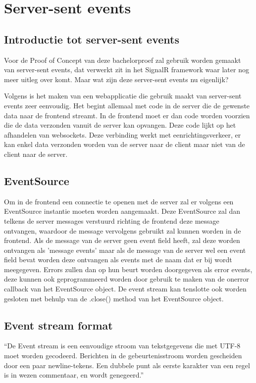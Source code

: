 \section{Server-sent events}
\subsection{Introductie tot server-sent events}
Voor de Proof of Concept van deze bachelorproef zal gebruik worden gemaakt van server-sent events, dat verwerkt zit in het SignalR framework waar later nog meer uitleg over komt. Maar wat zijn deze server-sent events nu eigenlijk?

Volgens \textcite{DevMozSSE} is het maken van een webapplicatie die gebruik maakt van server-sent events zeer eenvoudig. Het begint allemaal met code in de server die de gewenste data naar de frontend streamt. In de frontend moet er dan code worden voorzien die de data verzonden vanuit de server kan opvangen. Deze code lijkt op het afhandelen van websockets. Deze verbinding werkt met eenrichtingsverkeer, er kan enkel data verzonden worden van de server naar de client maar niet van de client naar de server. 

\subsection{EventSource}
Om in de frontend een connectie te openen met de server zal er volgens \textcite{DevMozSSE} een EventSource instantie moeten worden aangemaakt. Deze EventSource zal dan telkens de server messages verstuurd richting de frontend deze message ontvangen, waardoor de message vervolgens gebruikt zal kunnen worden in de frontend.
Als de message van de server geen event field heeft, zal deze worden ontvangen als 'message events' maar als de message van de server wel een event field bevat worden deze ontvangen als events met de naam dat er bij wordt meegegeven. Errors zullen dan op hun beurt worden doorgegeven als error events, deze kunnen ook geprogrammeerd worden door gebruik te maken van de onerror callback van het EventSource object. De event stream kan tenslotte ook worden gesloten met behulp van de .close() method van het EventSource object.

\subsection{Event stream format}
``De Event stream is een eenvoudige stroom van tekstgegevens die met UTF-8 moet worden gecodeerd. Berichten in de gebeurtenisstroom worden gescheiden door een paar newline-tekens. Een dubbele punt als eerste karakter van een regel is in wezen commentaar, en wordt genegeerd.''\autocite{DevMozSSE}

